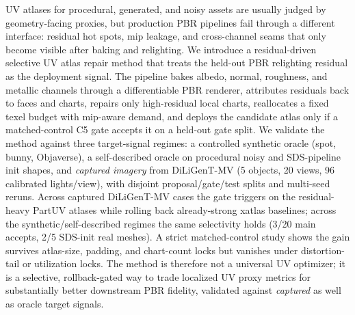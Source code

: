 
UV atlases for procedural, generated, and noisy assets are usually
judged by geometry-facing proxies, but production PBR pipelines fail
through a different interface: residual hot spots, mip leakage, and
cross-channel seams that only become visible after baking and
relighting. We introduce a residual-driven selective UV atlas repair
method that treats the held-out PBR relighting residual as the
deployment signal. The pipeline bakes albedo, normal, roughness, and
metallic channels through a differentiable PBR renderer, attributes
residuals back to faces and charts, repairs only high-residual local
charts, reallocates a fixed texel budget with mip-aware demand, and
deploys the candidate atlas only if a matched-control C5 gate accepts
it on a held-out gate split. We validate the method against three
target-signal regimes: a controlled synthetic oracle (spot, bunny,
Objaverse), a self-described oracle on procedural noisy and
SDS-pipeline init shapes, and \emph{captured imagery} from
DiLiGenT-MV (5 objects, 20 views, 96 calibrated lights/view), with
disjoint proposal/gate/test splits and multi-seed reruns. Across
captured DiLiGenT-MV cases the gate triggers on the residual-heavy
PartUV atlases while rolling back already-strong xatlas baselines;
across the synthetic/self-described regimes the same selectivity
holds (3/20 main accepts, 2/5 SDS-init real meshes). A strict
matched-control study shows the gain survives atlas-size, padding,
and chart-count locks but vanishes under distortion-tail or
utilization locks. The method is therefore not a universal UV
optimizer; it is a selective, rollback-gated way to trade localized
UV proxy metrics for substantially better downstream PBR fidelity,
validated against \emph{captured} as well as oracle target signals.
